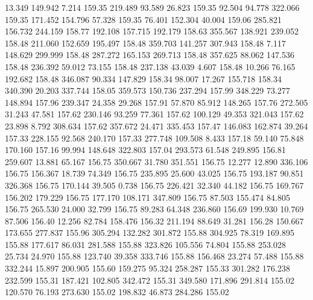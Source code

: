   13.349  149.942    7.214       159.35
 219.489   93.589   26.823       159.35
  92.504   94.778  322.066       159.35
 171.452  154.796   57.328       159.35
  76.401  152.304   40.004       159.06
 285.821  156.732  244.159       158.77
 192.108  157.715  192.179       158.63
 355.567  138.921  239.052       158.48
 211.060  152.659  195.497       158.48
 359.703  141.257  307.943       158.48
   7.117  148.629  299.999       158.48
 287.272  165.153  269.713       158.48
 357.625   88.062  147.536       158.48
 236.392   59.012   73.155       158.48
 237.138   43.039    4.607       158.48
  10.266   76.165  192.682       158.48
 346.087   90.334  147.829       158.34
  98.007   17.267  155.718       158.34
 340.390   20.203  337.744       158.05
 359.573  150.736  237.294       157.99
 348.229   73.277  148.894       157.96
 239.347   24.358   29.268       157.91
  57.870   85.912  148.265       157.76
 272.505   31.243   47.581       157.62
 230.146   93.259   77.361       157.62
 100.129   49.353  321.043       157.62
  23.898    8.792  308.634       157.62
 357.672   24.471  335.453       157.47
 146.083  162.874   39.264       157.33
 228.155   92.568  240.170       157.33
 277.748  109.508    8.433       157.18
  59.140   75.848  170.160       157.16
  99.994  148.648  322.803       157.04
 293.573   61.548  249.895       156.81
 259.607   13.881   65.167       156.75
 350.667   31.780  351.551       156.75
  12.277   12.890  336.106       156.75
 156.367   18.739   74.349       156.75
 235.895   25.600   43.025       156.75
 193.187   90.851  326.368       156.75
 170.144   39.505    0.738       156.75
 226.421   32.340   44.182       156.75
 169.767  156.202  179.229       156.75
 177.170  108.171  347.809       156.75
  87.503  155.474   84.805       156.75
 265.530   24.000   32.799       156.75
  89.283   64.348  236.860       156.69
 199.930   10.769   87.506       156.40
  12.256   82.784  158.476       156.32
 211.194   88.649   31.281       156.28
 150.667  173.655  277.837       155.96
 305.294  132.282  301.872       155.88
 304.925   78.319  169.895       155.88
 177.617   86.031  281.588       155.88
 323.826  105.556   74.804       155.88
 253.028   25.734   24.970       155.88
 123.740   39.358  333.746       155.88
 156.468   23.274   57.488       155.88
 332.244   15.897  200.905       155.60
 159.275   95.324  258.287       155.33
 301.282  176.238  232.599       155.31
 187.421  102.805  342.472       155.31
 349.580  171.896  291.814       155.02
 120.570   76.193  273.630       155.02
 198.832   46.873  284.286       155.02
